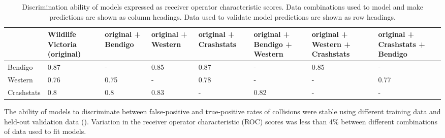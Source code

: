 \begin{table}[htp]
\caption[Discrimination ability of models using all combinations of independent data]{Discrimination ability of models expressed as receiver operator characteristic scores. Data combinations used to model and make predictions are shown as column headings. Data used to validate model predictions are shown as row headings.}
\begin{tabularx}{\textwidth}{YYYYYYYY} \toprule
	& Wildlife Victoria
(original) & original + Bendigo & original + Western & original + Crashstats & original + Bendigo + Western & original + Western + Crashstats & original + Crashstats + Bendigo \\ 
  \midrule
Bendigo & 0.87 & - & 0.85 & 0.87 & - & 0.85 & - \\ 
Western & 0.76 & 0.75 & - & 0.78 & - & - & 0.77 \\ 
Crashstats & 0.8 & 0.8 & 0.83 & - & 0.82 & - & - \\
\bottomrule
\end{tabularx}
\label{val_glm_roc}
\end{table}

The ability of models to discriminate between false-positive and true-positive rates of collisions were stable using different training data and held-out validation data (). Variation in the receiver operator characteristic (ROC) scores was less than 4\% between different combinations of data used to fit models.

